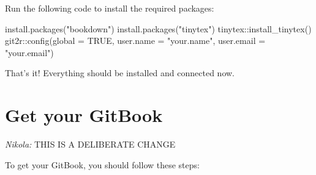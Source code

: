 \documentclass[
]{book}
\newenvironment{Shaded}{\begin{snugshade}}{\end{snugshade}}
\newcommand{\AttributeTok}[1]{\textcolor[rgb]{0.77,0.63,0.00}{#1}}
\newcommand{\ConstantTok}[1]{\textcolor[rgb]{0.00,0.00,0.00}{#1}}
\newcommand{\FunctionTok}[1]{\textcolor[rgb]{0.00,0.00,0.00}{#1}}
\newcommand{\NormalTok}[1]{#1}
\newcommand{\SpecialCharTok}[1]{\textcolor[rgb]{0.00,0.00,0.00}{#1}}
\newcommand{\StringTok}[1]{\textcolor[rgb]{0.31,0.60,0.02}{#1}}
\begin{document}
Run the following code to install the required packages:

\begin{Shaded}
\begin{Highlighting}[]
\FunctionTok{install.packages}\NormalTok{(}\StringTok{"bookdown"}\NormalTok{)}
\FunctionTok{install.packages}\NormalTok{(}\StringTok{"tinytex"}\NormalTok{)}
\NormalTok{tinytex}\SpecialCharTok{::}\FunctionTok{install\_tinytex}\NormalTok{()}
\NormalTok{git2r}\SpecialCharTok{::}\FunctionTok{config}\NormalTok{(}\AttributeTok{global =} \ConstantTok{TRUE}\NormalTok{, }\AttributeTok{user.name =} \StringTok{"your.name"}\NormalTok{, }\AttributeTok{user.email =} \StringTok{"your.email"}\NormalTok{)}
\end{Highlighting}
\end{Shaded}

That's it! Everything should be installed and connected now.

\hypertarget{getgitbook}{%
\chapter{Get your GitBook}\label{getgitbook}}

\emph{Nikola:} THIS IS A DELIBERATE CHANGE

To get your GitBook, you should follow these steps:
\end{document}
